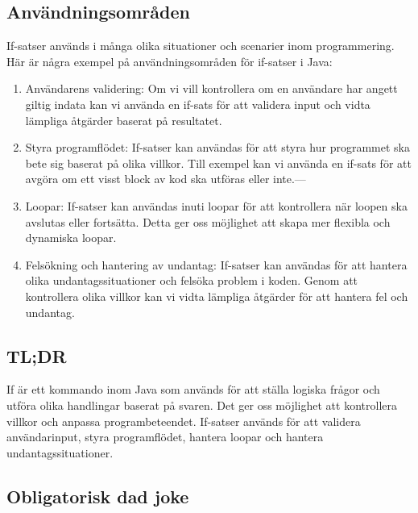\hypertarget{anvuxe4ndningsomruxe5den}{%
\subsection{Användningsområden}\label{anvuxe4ndningsomruxe5den}}

If-satser används i många olika situationer och scenarier inom
programmering. Här är några exempel på användningsområden för if-satser
i Java:

\begin{enumerate}
\def\labelenumi{\arabic{enumi}.}
\tightlist
\item
  Användarens validering: Om vi vill kontrollera om en användare har
  angett giltig indata kan vi använda en if-sats för att validera input
  och vidta lämpliga åtgärder baserat på resultatet.
\item
  Styra programflödet: If-satser kan användas för att styra hur
  programmet ska bete sig baserat på olika villkor. Till exempel kan vi
  använda en if-sats för att avgöra om ett visst block av kod ska
  utföras eller inte.---
\item
  Loopar: If-satser kan användas inuti loopar för att kontrollera när
  loopen ska avslutas eller fortsätta. Detta ger oss möjlighet att skapa
  mer flexibla och dynamiska loopar.
\item
  Felsökning och hantering av undantag: If-satser kan användas för att
  hantera olika undantagssituationer och felsöka problem i koden. Genom
  att kontrollera olika villkor kan vi vidta lämpliga åtgärder för att
  hantera fel och undantag.
\end{enumerate}

\hypertarget{tldr}{%
\subsection{TL;DR}\label{tldr}}

If är ett kommando inom Java som används för att ställa logiska frågor
och utföra olika handlingar baserat på svaren. Det ger oss möjlighet att
kontrollera villkor och anpassa programbeteendet. If-satser används för
att validera användarinput, styra programflödet, hantera loopar och
hantera undantagssituationer.

\hypertarget{obligatorisk-dad-joke}{%
\subsection{Obligatorisk dad joke}\label{obligatorisk-dad-joke}}


